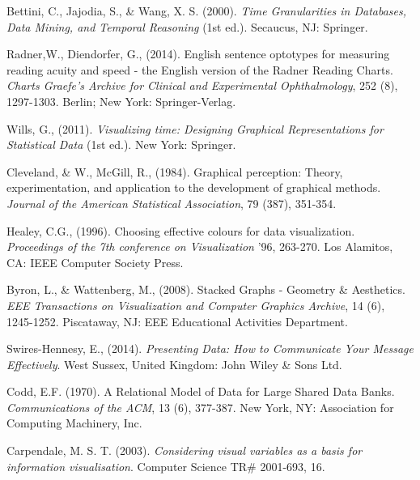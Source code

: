 \documentclass[12pt]{article}
\begin{document}
\begin{thebibliography}{1}
   Bettini, C., Jajodia, S., \& Wang, X. S. (2000). {\em Time Granularities in
Databases, Data Mining, and Temporal Reasoning} (1st ed.). Secaucus, NJ: Springer.

   Radner,W., Diendorfer, G., (2014). English sentence optotypes for measuring
reading acuity and speed - the English version of the Radner Reading Charts.
{\em Charts Graefe's Archive for Clinical and Experimental Ophthalmology}, 252 (8), 1297-1303. Berlin; New York: Springer-Verlag.

   Wills, G., (2011). {\em Visualizing time: Designing Graphical Representations
for Statistical Data} (1st ed.). New York: Springer.

   Cleveland, \& W., McGill, R., (1984). Graphical perception: Theory,
experimentation, and application to the development of graphical methods. {\em Journal of the American Statistical Association}, 79 (387), 351-354.
  
   Healey, C.G., (1996). Choosing effective colours for data visualization. {\em Proceedings of the 7th conference on Visualization} '96, 263-270. Los Alamitos, CA: IEEE Computer Society Press. 
  
   Byron, L., \& Wattenberg, M., (2008). Stacked Graphs - Geometry \&
Aesthetics. {\em EEE Transactions on Visualization and Computer Graphics Archive}, 14 (6), 1245-1252. Piscataway, NJ: EEE Educational Activities Department.

   Swires-Hennesy, E., (2014). {\em Presenting Data: How to Communicate Your Message Effectively}. West Sussex, United Kingdom: John Wiley \& Sons Ltd.
  
   Codd, E.F. (1970). A Relational Model of Data for Large Shared Data Banks.
{\em Communications of the ACM}, 13 (6), 377-387. New York, NY: Association for Computing Machinery, Inc. 

   Carpendale, M. S. T. (2003). {\em Considering visual variables as a basis for information visualisation}. Computer Science TR\# 2001-693, 16.   
  
  \end{thebibliography}
 
\end{document}
